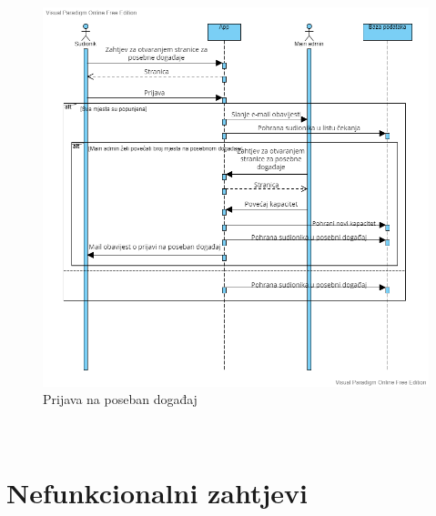 		        \begin{figure}[H]
			            \includegraphics[scale=0.55]{slike/Spec_event_prijava_seq.png} %
			            \centering
			            \caption{Prijava na poseban događaj}
			            \label{fig:seq-dijagram2}
		        \end{figure}\\
	
				\eject
	
		\section{Nefunkcionalni zahtjevi}
		
